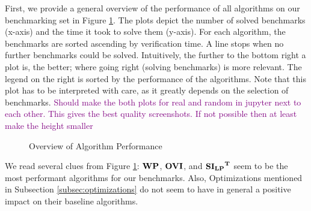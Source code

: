 First, we provide a general overview of the performance of all algorithms on our benchmarking set in Figure \ref{fig:AlgoPerformance}.
The plots depict the number of solved benchmarks (x-axis) and the time it took to solve them (y-axis). 
For each algorithm, the benchmarks are sorted ascending by verification time. A line stops when no further benchmarks could be solved.
Intuitively, the further to the bottom right a plot is, the better; where going right (solving benchmarks) is more relevant.
The legend on the right is sorted by the performance of the algorithms.
Note that this plot has to be interpreted with care, as it greatly depends on the selection of benchmarks.
\textcolor{purple}{Should make the both plots for real and random in jupyter next to each other. This gives the best quality screenshots. If not possible then at least make the height smaller}
\begin{figure}
    \centering
    \qquad
    \caption[Overview of Algorithm Performance]{Overview of Algorithm Performance}%
    \label{fig:AlgoPerformance}
\end{figure}


We read several clues from Figure \ref{fig:AlgoPerformance}: 
$\mathbf{WP}$, $\mathbf{OVI}$, and $\mathbf{\mathbf{SI_{LP}}^T}$ seem to be the most performant algorithms for our benchmarks. 
Also, Optimizations mentioned in Subsection \ref{subsec:optimizations} do not seem to have in general a positive impact on their baseline algorithms.

